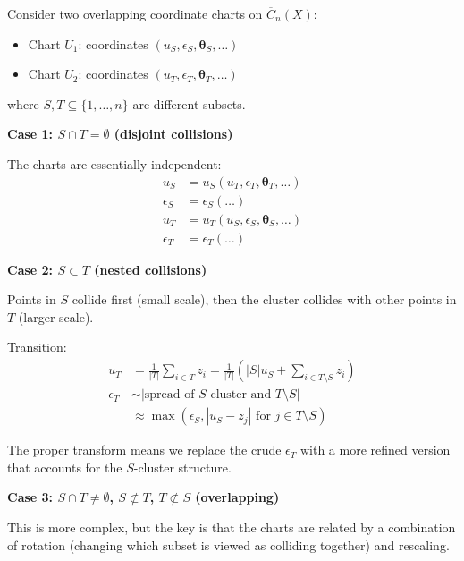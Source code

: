 \begin{proposition}\label{prop:transition-functions}
Consider two overlapping coordinate charts on $\overline{C}_n(X)$:
\begin{itemize}
\item Chart $U_1$: coordinates $(u_S, \epsilon_S, \boldsymbol{\theta}_S, \ldots)$
\item Chart $U_2$: coordinates $(u_T, \epsilon_T, \boldsymbol{\theta}_T, \ldots)$
\end{itemize}

where $S, T \subseteq \{1,\ldots,n\}$ are different subsets.

\textbf{Case 1: $S \cap T = \emptyset$ (disjoint collisions)}

The charts are essentially independent:
\begin{align}
u_S &= u_S(u_T, \epsilon_T, \boldsymbol{\theta}_T, \ldots)\\
\epsilon_S &= \epsilon_S(\ldots) \\
u_T &= u_T(u_S, \epsilon_S, \boldsymbol{\theta}_S, \ldots)\\
\epsilon_T &= \epsilon_T(\ldots)
\end{align}

\textbf{Case 2: $S \subset T$ (nested collisions)}

Points in $S$ collide first (small scale), then the cluster collides with other points
in $T$ (larger scale).

Transition:
\begin{align}
u_T &= \frac{1}{|T|} \sum_{i \in T} z_i = \frac{1}{|T|}\left( |S| u_S + \sum_{i \in T \setminus S} z_i \right)\\
\epsilon_T &\sim |\text{spread of } S \text{-cluster and } T\setminus S| \\
&\approx \max(\epsilon_S, |u_S - z_j| \text{ for } j \in T\setminus S)
\end{align}

The proper transform means we replace the crude $\epsilon_T$ with a more refined version
that accounts for the $S$-cluster structure.

\textbf{Case 3: $S \cap T \neq \emptyset$, $S \not\subset T$, $T \not\subset S$ (overlapping)}

This is more complex, but the key is that the charts are related by a combination of
rotation (changing which subset is viewed as colliding together) and rescaling.
\end{proposition}

